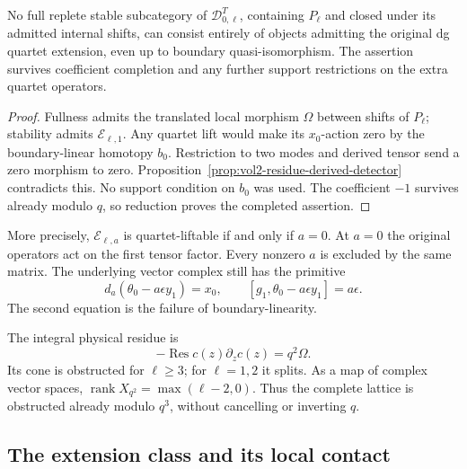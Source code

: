 \begin{theorem}\label{thm:vol2-no-stable-quartet-sector}
No full replete stable subcategory of
\(\mathcal D^T_{0,\ell}\), containing \(P_\ell\) and
closed under its admitted internal shifts, can consist
entirely of objects admitting the original dg quartet
extension, even up to boundary quasi-isomorphism.
The assertion survives coefficient completion and any further
support restrictions on the extra quartet operators.
\end{theorem}
\begin{proof}
Fullness admits the translated local morphism \(\Omega\)
between shifts of \(P_\ell\); stability admits
\(\mathcal E_{\ell,1}\). Any quartet lift would make its
\(x_0\)-action zero by the boundary-linear homotopy \(b_0\).
Restriction to two modes and derived tensor send a zero
morphism to zero. Proposition~\ref{prop:vol2-residue-derived-detector}
contradicts this. No support condition on \(b_0\) was used.
The coefficient \(-1\) survives already modulo \(q\), so
reduction proves the completed assertion.
\end{proof}

More precisely, \(\mathcal E_{\ell,a}\) is quartet-liftable
if and only if \(a=0\). At \(a=0\) the original operators act
on the first tensor factor. Every nonzero \(a\) is excluded
by the same matrix. The underlying vector complex still has
the primitive
\[
 d_a(\theta_0-a\epsilon y_1)=x_0,
 \qquad
 [g_1,\theta_0-a\epsilon y_1]=a\epsilon.
\]
The second equation is the failure of boundary-linearity.

The integral physical residue is
\[
 -\operatorname{Res}c(z)\partial_zc(z)=q^2\Omega.
\]
Its cone is obstructed for \(\ell\ge3\); for \(\ell=1,2\)
it splits. As a map of complex vector spaces,
\(\operatorname{rank}X_{q^2}=\max(\ell-2,0)\).
Thus the complete lattice is obstructed already modulo
\(q^3\), without cancelling or inverting \(q\).

\subsection{The extension class and its local contact}

